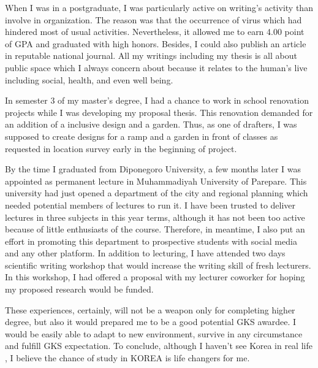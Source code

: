 \documentclass[11pt]{simart} %
\begin{document}
When I was in a postgraduate, I was particularly active on writing's activity than involve in organization. The reason was that the occurrence of virus which had hindered most of usual activities. Nevertheless, it allowed me to earn 4.00 point of GPA and graduated with high honors. Besides, I could also publish an article in reputable national journal. All my writings including my thesis is all about public space which I always concern about because it relates to the human's live including social, health, and even well being.

In semester 3 of my master's degree, I had a chance to work in school renovation projects while I was developing my proposal thesis. This renovation demanded for an addition of a inclusive design and a garden. Thus, as one of drafters, I was supposed to create designs for a ramp and a garden in front of classes as requested in location survey early in the beginning of project. %

By the time I graduated from Diponegoro University, a few months later I was appointed as permanent lecture in Muhammadiyah University of Parepare.
This university had just opened a department of the city and regional planning which needed potential members of lectures to run it.
I have been trusted to deliver lectures in three subjects in this year terms, although it has not been too active because of little enthusiasts of the course.
Therefore, in meantime, I also put an effort in promoting this department to prospective students with social media and any other platform.
In addition to lecturing, I have attended two days scientific writing workshop that would increase the writing skill of fresh lecturers. In this workshop, I had offered a proposal with my lecturer coworker for hoping my proposed research would be funded.

These experiences, certainly, will not be a weapon only for completing higher degree, but also it would prepared me to be a good potential GKS awardee. I would be easily able to adapt to new environment, survive in any circumstance and fulfill GKS expectation. To conclude, although I haven't see Korea in real life , I believe the chance of study in KOREA is life changers for me.
















%

%
\end{document}
